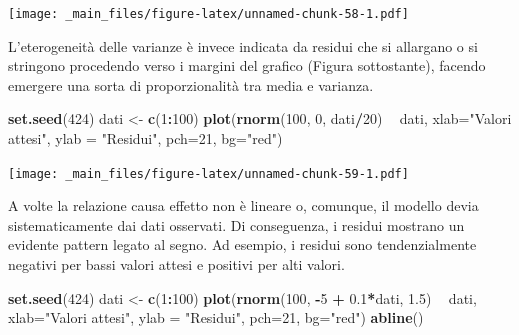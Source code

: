 \documentclass[a4paper,12pt,oneside]{book}
\newenvironment{Shaded}{\begin{snugshade}}{\end{snugshade}}
\newcommand{\KeywordTok}[1]{\textcolor[rgb]{0.13,0.29,0.53}{\textbf{#1}}}
\newcommand{\DataTypeTok}[1]{\textcolor[rgb]{0.13,0.29,0.53}{#1}}
\newcommand{\DecValTok}[1]{\textcolor[rgb]{0.00,0.00,0.81}{#1}}
\newcommand{\FloatTok}[1]{\textcolor[rgb]{0.00,0.00,0.81}{#1}}
\newcommand{\StringTok}[1]{\textcolor[rgb]{0.31,0.60,0.02}{#1}}
\newcommand{\OperatorTok}[1]{\textcolor[rgb]{0.81,0.36,0.00}{\textbf{#1}}}
\newcommand{\NormalTok}[1]{#1}
\theoremstyle{definition}
\theoremstyle{definition}
\theoremstyle{definition}
\theoremstyle{remark}
\begin{document}
\texttt{[image: \_main\_files/figure-latex/unnamed-chunk-58-1.pdf]}

L'eterogeneità delle varianze è invece indicata da residui che si
allargano o si stringono procedendo verso i margini del grafico (Figura
sottostante), facendo emergere una sorta di proporzionalità tra media e
varianza.

\begin{Shaded}
\begin{Highlighting}[]
\KeywordTok{set.seed}\NormalTok{(}\DecValTok{424}\NormalTok{)}
\NormalTok{dati <-}\StringTok{ }\KeywordTok{c}\NormalTok{(}\DecValTok{1}\OperatorTok{:}\DecValTok{100}\NormalTok{)}
\KeywordTok{plot}\NormalTok{(}\KeywordTok{rnorm}\NormalTok{(}\DecValTok{100}\NormalTok{, }\DecValTok{0}\NormalTok{, dati}\OperatorTok{/}\DecValTok{20}\NormalTok{) }\OperatorTok{~}\StringTok{ }\NormalTok{dati, }\DataTypeTok{xlab=}\StringTok{"Valori attesi"}\NormalTok{, }
     \DataTypeTok{ylab =} \StringTok{"Residui"}\NormalTok{, }\DataTypeTok{pch=}\DecValTok{21}\NormalTok{, }\DataTypeTok{bg=}\StringTok{"red"}\NormalTok{)}
\end{Highlighting}
\end{Shaded}

\texttt{[image: \_main\_files/figure-latex/unnamed-chunk-59-1.pdf]}

A volte la relazione causa effetto non è lineare o, comunque, il modello
devia sistematicamente dai dati osservati. Di conseguenza, i residui
mostrano un evidente pattern legato al segno. Ad esempio, i residui sono
tendenzialmente negativi per bassi valori attesi e positivi per alti
valori.

\begin{Shaded}
\begin{Highlighting}[]
\KeywordTok{set.seed}\NormalTok{(}\DecValTok{424}\NormalTok{)}
\NormalTok{dati <-}\StringTok{ }\KeywordTok{c}\NormalTok{(}\DecValTok{1}\OperatorTok{:}\DecValTok{100}\NormalTok{)}
\KeywordTok{plot}\NormalTok{(}\KeywordTok{rnorm}\NormalTok{(}\DecValTok{100}\NormalTok{, }\OperatorTok{-}\DecValTok{5} \OperatorTok{+}\StringTok{ }\FloatTok{0.1}\OperatorTok{*}\NormalTok{dati, }\FloatTok{1.5}\NormalTok{) }\OperatorTok{~}\StringTok{ }\NormalTok{dati, }\DataTypeTok{xlab=}\StringTok{"Valori attesi"}\NormalTok{, }\DataTypeTok{ylab =} \StringTok{"Residui"}\NormalTok{, }\DataTypeTok{pch=}\DecValTok{21}\NormalTok{, }\DataTypeTok{bg=}\StringTok{"red"}\NormalTok{)}
\KeywordTok{abline}\NormalTok{()}
\end{Highlighting}
\end{Shaded}
\end{document}
